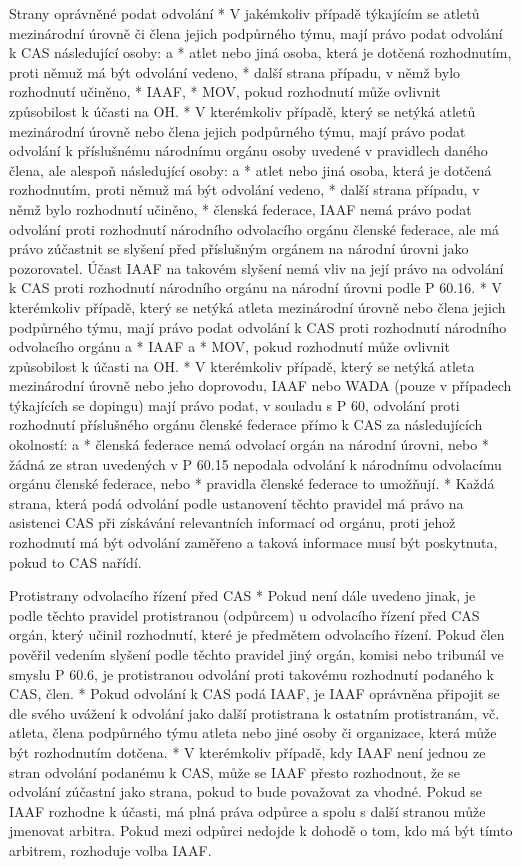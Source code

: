 Strany oprávněné podat odvolání
* V jakémkoliv případě týkajícím se atletů mezinárodní úrovně či člena jejich podpůrného týmu, mají právo podat odvolání k CAS následující osoby:
  \begitems \style a
  * atlet nebo jiná osoba, která je dotčená rozhodnutím, proti němuž má být odvolání vedeno,
  * další strana případu, v němž bylo rozhodnutí učiněno,
  * IAAF,
  * MOV, pokud rozhodnutí může ovlivnit způsobilost k účasti na OH.
  \enditems
* V kterémkoliv případě, který se netýká atletů mezinárodní úrovně nebo člena jejich podpůrného týmu, mají právo podat odvolání k příslušnému národnímu orgánu osoby uvedené v pravidlech daného člena, ale alespoň následující osoby:
  \begitems \style a
  * atlet nebo jiná osoba, která je dotčená rozhodnutím, proti němuž má být odvolání vedeno,
  * další strana případu, v němž bylo rozhodnutí učiněno,
  * členská federace,
  \enditems
IAAF nemá právo podat odvolání proti rozhodnutí národního odvolacího orgánu členské federace, ale má právo zúčastnit se slyšení před příslušným orgánem na národní úrovni jako pozorovatel. Účast IAAF na takovém slyšení nemá vliv na její právo na odvolání k CAS proti rozhodnutí národního orgánu na národní úrovni podle P 60.16.
* V kterémkoliv případě, který se netýká atleta mezinárodní úrovně nebo člena jejich podpůrného týmu, mají právo podat odvolání k CAS proti rozhodnutí národního odvolacího orgánu
  \begitems \style a
  * IAAF a
  * MOV, pokud rozhodnutí může ovlivnit způsobilost k účasti na OH.
  \enditems
* V kterémkoliv případě, který se netýká atleta mezinárodní úrovně nebo jeho doprovodu, IAAF nebo WADA (pouze v případech týkajících se dopingu) mají právo podat, v souladu s P 60, odvolání proti rozhodnutí příslušného orgánu členské federace přímo k CAS za následujících okolností:
  \begitems \style a
  * členská federace nemá odvolací orgán na národní úrovni, nebo
  * žádná ze stran uvedených v P 60.15 nepodala odvolání k národnímu odvolacímu orgánu členské federace, nebo
  * pravidla členské federace to umožňují.
  \enditems
* Každá strana, která podá odvolání podle ustanovení těchto pravidel má právo na asistenci CAS při získávání relevantních informací od orgánu, proti jehož rozhodnutí má být odvolání zaměřeno a taková informace musí být poskytnuta, pokud to CAS nařídí.

Protistrany odvolacího řízení před CAS
* Pokud není dále uvedeno jinak, je podle těchto pravidel protistranou (odpůrcem) u odvolacího řízení před CAS orgán, který učinil rozhodnutí, které je předmětem odvolacího řízení. Pokud člen pověřil vedením slyšení podle těchto pravidel jiný orgán, komisi nebo tribunál ve smyslu P 60.6,  je protistranou odvolání proti takovému rozhodnutí podaného k CAS, člen.
* Pokud odvolání k CAS podá IAAF, je IAAF oprávněna připojit se dle svého uvážení k odvolání jako další protistrana k ostatním protistranám, vč. atleta, člena podpůrného týmu atleta nebo jiné osoby či organizace, která může být rozhodnutím dotčena.
* V kterémkoliv případě, kdy IAAF není jednou ze stran odvolání podanému k CAS, může se IAAF přesto rozhodnout, že se odvolání zúčastní jako strana, pokud to bude považovat za vhodné. Pokud se IAAF rozhodne k účasti, má plná práva odpůrce a spolu s další stranou může jmenovat arbitra. Pokud mezi odpůrci nedojde k dohodě o tom, kdo má být tímto arbitrem, rozhoduje volba IAAF.

